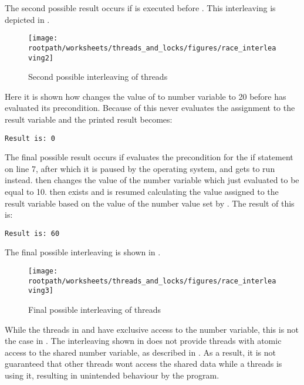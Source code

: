The second possible result occurs if  is executed before . This interleaving is depicted in .
\begin{figure}[htbp]
\centering
 \texttt{[image: \\rootpath/worksheets/threads\_and\_locks/figures/race\_interleaving2]} 
 \caption{Second possible interleaving of threads}
\label{fig:race_interleaving2}
\end{figure}
Here it is shown how  changes the value of to number variable to 20 before  has evaluated its precondition. Because of this  never evaluates the assignment to the result variable and the printed result becomes:
\begin{verbatim}
Result is: 0
\end{verbatim}

The final possible result occurs if  evaluates the precondition for the if statement on line 7, after which it is paused by the operating system, and  gets to run instead.  then changes the value of the number variable which  just evaluated to be equal to 10.  then exists and  is resumed calculating the value assigned to the result variable based on the value of the number value set by . The result of this is:
\begin{verbatim}
Result is: 60
\end{verbatim}
The final possible interleaving is shown in . 
\begin{figure}[htbp]
\centering
 \texttt{[image: \\rootpath/worksheets/threads\_and\_locks/figures/race\_interleaving3]} 
 \caption{Final possible interleaving of threads}
\label{fig:race_interleaving3}
\end{figure}

While the threads in  and  have exclusive access to the number variable, this is not the case in . The interleaving shown in  does not provide threads with atomic access to the shared number variable, as described in . As a result, it is not guaranteed that other threads wont access the shared data while a threads is using it, resulting in unintended behaviour by the program.

